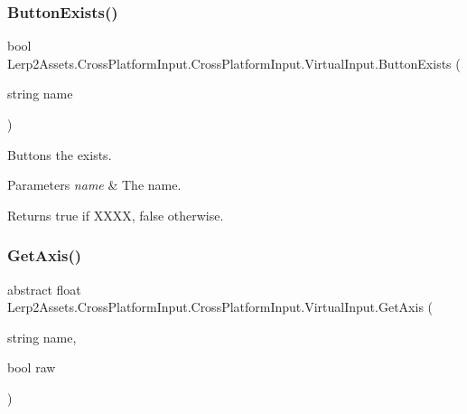 \subsubsection{\texorpdfstring{Button\+Exists()}{ButtonExists()}}
{\footnotesize\ttfamily bool Lerp2\+Assets.\+Cross\+Platform\+Input.\+Cross\+Platform\+Input.\+Virtual\+Input.\+Button\+Exists (\begin{DoxyParamCaption}\item[{string}]{name }\end{DoxyParamCaption})\hspace{0.3cm}{\ttfamily [inline]}}



Buttons the exists. 


\begin{DoxyParams}{Parameters}
{\em name} & The name.\\
\hline
\end{DoxyParams}
\begin{DoxyReturn}{Returns}
{\ttfamily true} if X\+X\+XX, {\ttfamily false} otherwise.
\end{DoxyReturn}
\mbox{\label{class_lerp2_assets_1_1_cross_platform_input_1_1_cross_platform_input_1_1_virtual_input_a76776877d69fea4fd538685816b03fab}} 
\subsubsection{\texorpdfstring{Get\+Axis()}{GetAxis()}}
{\footnotesize\ttfamily abstract float Lerp2\+Assets.\+Cross\+Platform\+Input.\+Cross\+Platform\+Input.\+Virtual\+Input.\+Get\+Axis (\begin{DoxyParamCaption}\item[{string}]{name,  }\item[{bool}]{raw }\end{DoxyParamCaption})\hspace{0.3cm}{\ttfamily [pure virtual]}}



